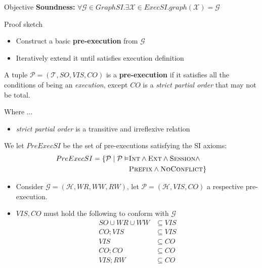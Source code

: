 \documentclass{beamer}
\begin{document}
\begin{frame}
	\begin{block}{Objective}
		\textbf{Soundness:} $ \forall \mathcal{G} \in GraphSI. \exists \mathcal{X} \in ExecSI. graph(\mathcal{X}) = \mathcal{G} $ 	
	\end{block}
	\begin{block}{Proof sketch}
		\begin{itemize}
			\item Construct a basic \textbf{pre-execution} from $\mathcal{G}$
			\item Iteratively extend it until satisfies execution definition
		\end{itemize}		
	\end{block}
\end{frame}

\begin{frame}
	\begin{definition}
		A tuple $\mathcal{P} = (\mathcal{T}, SO, VIS, CO) $ is a \textbf{pre-execution} if it satisfies all the conditions of being an \emph{execution}, except $CO$ is a \textit{strict partial order} that may not be total.
	\end{definition}
	Where ...
	\begin{itemize}
		\item \textit{strict partial order} is a transitive and irreflexive relation
	\end{itemize}
\end{frame}

\begin{frame}
	\begin{definition}
		We let $PreExecSI$ be the set of pre-executions satisfying the SI axioms:
		$$
		\begin{aligned}
			PreExecSI = \{ \mathcal{P} \mid \mathcal{P} \vDash & \textsc{Int} \wedge \textsc{Ext} \wedge \textsc{Session} \wedge \\
			& \textsc{Prefix} \wedge \textsc{NoConflict} \}
		\end{aligned}
		$$
	\end{definition}
\end{frame}

\begin{frame}
	\begin{itemize}
		\item Consider $\mathcal{G} = (\mathcal{H}, WR, WW, RW)$, let $\mathcal{P} = (\mathcal{H}, VIS, CO)$ a respective pre-execution.
		\item $VIS,CO$ must hold the following to conform with $\mathcal{G}$ \\
			\begin{align*}
				SO \cup WR \cup WW & \subseteq VIS \\
				CO; VIS & \subseteq VIS \\
				VIS & \subseteq CO \\
				CO; CO & \subseteq CO \\
				VIS; RW & \subseteq CO
			\end{align*}
	\end{itemize}
\end{frame}
\end{document}

